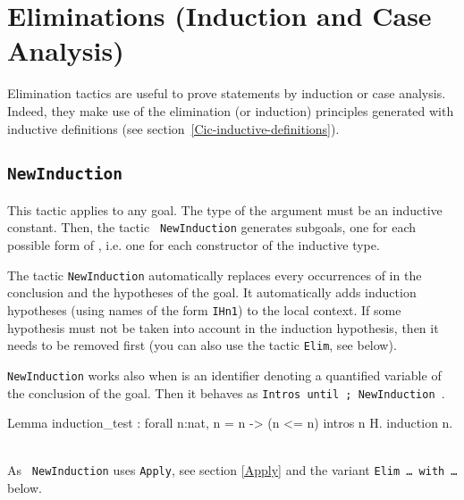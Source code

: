 \section{Eliminations (Induction and Case Analysis)}
Elimination tactics are useful to prove statements by induction or
case analysis.
Indeed, they make use of the elimination (or induction) principles
generated with inductive definitions (see 
section~\ref{Cic-inductive-definitions}).

\subsection{\tt NewInduction \term}
This tactic applies to any goal. The type of the argument
{\term} must be an inductive constant. Then, the tactic {\tt
NewInduction} generates subgoals, one for each possible form of
{\term}, i.e. one for each constructor of the inductive type.

The tactic {\tt NewInduction} automatically replaces every occurrences
of {\term} in the conclusion and the hypotheses of the goal.
It automatically adds induction hypotheses (using names of the form
{\tt IHn1}) to the local context. If some hypothesis must not be taken into
account in the induction hypothesis, then it needs to be removed first
(you can also use the tactic {\tt Elim}, see below).

{\tt NewInduction} works also when {\term} is an identifier denoting a
  quantified variable of the conclusion of the goal. Then it behaves as
  {\tt Intros until {\ident}; NewInduction {\ident}}.

\begin{coq_example}
Lemma induction_test : forall n:nat, n = n -> (n <= n)%
intros n H.
induction n.
\end{coq_example}

\begin{ErrMsgs}
\item {}
\item {}\\ As {\tt
    NewInduction} uses {\tt Apply}, see section \ref{Apply} and the variant
  {\tt Elim \dots\ with \dots} below.
\end{ErrMsgs}

